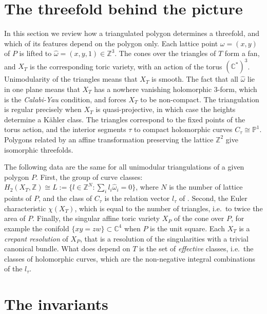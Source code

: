 \documentclass[11pt]{article}
\newcommand{\Z}{\mathbb{Z}}
\newcommand{\C}{\mathbb{C}}
\newcommand{\PP}{\mathbb{P}}
\newcommand{\hatw}{\widehat{\omega}}
\begin{document}
\section{The threefold behind the picture}\label{sec:geometry}

In this section we review how a triangulated polygon determines a threefold, and which of its
features depend on the polygon only. Each lattice point $\omega=(x,y)$ of $P$ is lifted to
$\hatw=(x,y,1)\in\Z^3$. The cones over the triangles of $T$ form a fan, and $X_T$ is the
corresponding toric variety, with an action of the torus $(\C^*)^3$. Unimodularity of the
triangles means that $X_T$ is smooth. The fact that all $\hatw$ lie in one plane means that $X_T$
has a nowhere vanishing holomorphic 3-form, which is the \textit{Calabi-Yau} condition, and
forces $X_T$ to be non-compact. The triangulation is regular precisely when $X_T$ is quasi-projective, in which case the heights determine a K\"ahler class.
The triangles correspond to the fixed points of the torus action, and the interior segments
$\tau$ to compact holomorphic curves $C_\tau\cong\PP^1$. Polygons related by an affine
transformation preserving the lattice $\Z^2$ give isomorphic threefolds.

The following data are the same for all unimodular triangulations of a given polygon $P$.
First, the group of curve classes: $H_2(X_T,\Z)\cong L:=\{l\in\Z^N:\sum_i l_i\hatw_i=0\}$, where
$N$ is the number of lattice points of $P$, and the class of $C_\tau$ is the relation vector
$l_\tau$ of \cite{notes}. Second, the Euler characteristic $\chi(X_T)$, which is equal to the
number of triangles, i.e.\ to twice the area of $P$. Finally, the singular affine toric variety
$X_P$ of the cone over $P$, for example the conifold $\{xy=zw\}\subset\C^4$ when $P$ is the unit
square. Each $X_T$ is a \textit{crepant resolution} of $X_P$, that is a resolution of the
singularities with a trivial canonical bundle. What does depend on $T$ is the set of \textit{effective}
classes, i.e.\ the classes of holomorphic curves, which are the non-negative integral
combinations of the $l_\tau$.

\section{The invariants}\label{sec:invariants}
\end{document}
